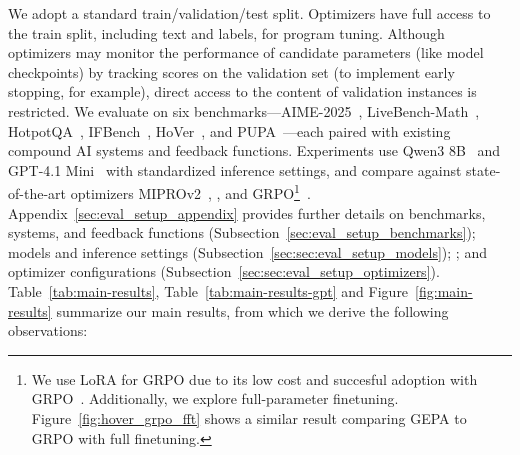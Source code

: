 \documentclass{article} %
\begin{document}
We adopt a standard train/validation/test split.
Optimizers have full access to the train split, including text and labels, for program tuning.
Although optimizers may monitor the performance of candidate parameters (like model checkpoints) by tracking scores on the validation set (to implement early stopping, for example), direct access to the content of validation instances is restricted.
We evaluate on six benchmarks—AIME-2025~\citep{aime_2025}, LiveBench-Math~\citep{livebench}, HotpotQA~\citep{hotpotqa_bench}, IFBench~\citep{ifbench_bench}, HoVer~\citep{hover_bench}, and PUPA~\citep{papillon_bench}—each paired with existing compound AI systems and feedback functions.
Experiments use Qwen3 8B~\citep{qwen3_technical_report} and GPT-4.1 Mini~\citep{gpt_41_model} with standardized inference settings, and compare against state-of-the-art optimizers MIPROv2~\citep{miprov2}, , and GRPO\footnote{We use LoRA for GRPO due to its low cost and succesful adoption with GRPO~\citep{wang_tina_2025, xu_not_2025, li_prorank_2025, yue_hybrid_2025, sun_detection_2025, hayou_plop_2025, zhao_d1_2025, teknium_hermes_2024, zhao_group_2024, sidahmed_parameter_2024}. Additionally, we explore full-parameter finetuning. Figure~\ref{fig:hover_grpo_fft} shows a similar result comparing GEPA to GRPO with full finetuning.}~\citep{grpo_paper}. Appendix~\ref{sec:eval_setup_appendix} provides further details on benchmarks, systems, and feedback functions (Subsection~\ref{sec:eval_setup_benchmarks}); models and inference settings (Subsection~\ref{sec:sec:eval_setup_models}); ;
and optimizer configurations (Subsection~\ref{sec:sec:eval_setup_optimizers}). Table~\ref{tab:main-results}, Table~\ref{tab:main-results-gpt} and Figure~\ref{fig:main-results} summarize our main results, from which we derive the following observations:
\end{document}
